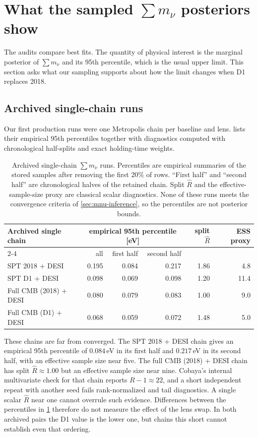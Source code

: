\documentclass[11pt]{article}
\theoremstyle{remark}
\newcommand{\mnu}{\sum m_\nu}
\numberwithin{equation}{section}
\begin{document}
 \section{What the sampled \texorpdfstring{$\mnu$}{neutrino-mass} posteriors show}
\label{sec:results-mnu}

The audits compare best fits. The quantity of physical interest is the marginal posterior of $\mnu$ and its 95th percentile, which is the usual upper limit. This section asks what our sampling supports about how the limit changes when D1 replaces 2018.

\subsection{Archived single-chain runs}
Our first production runs were one Metropolis chain per baseline and lens.  lists their empirical 95th percentiles together with diagnostics computed with chronological half-splits and exact holding-time weights.

\begin{table}[t]
  \centering
  \caption{Archived single-chain $\mnu$ runs. Percentiles are empirical summaries of the stored samples after removing the first 20\% of rows. ``First half'' and ``second half'' are chronological halves of the retained chain. Split $\hat R$ and the effective-sample-size proxy are classical scalar diagnostics. None of these runs meets the convergence criteria of \cref{sec:mnu-inference}, so the percentiles are not posterior bounds.}
  \label{tab:archived-chains}
  \small
  \begin{tabular}{@{}l r r r r r@{}}
\toprule
Archived single chain & \multicolumn{3}{c}{empirical 95th percentile [eV]} & split $\hat R$ & ESS proxy \\
\cmidrule(lr){2-4}
 & all & first half & second half & & \\
\midrule
SPT 2018 + DESI & 0.195 & 0.084 & 0.217 & 1.86 & 4.8 \\
SPT D1 + DESI & 0.098 & 0.069 & 0.098 & 1.20 & 11.4 \\
Full CMB (2018) + DESI & 0.080 & 0.079 & 0.083 & 1.00 & 9.0 \\
Full CMB (D1) + DESI & 0.068 & 0.059 & 0.072 & 1.48 & 5.0 \\
\bottomrule
\end{tabular}
 \end{table}

These chains are far from converged. The SPT 2018 + DESI chain gives an empirical 95th percentile of $0.084$\,eV in its first half and $0.217$\,eV in its second half, with an effective sample size near five. The full CMB (2018) + DESI chain has split $\hat R\approx1.00$ but an effective sample size near nine. Cobaya's internal multivariate check for that chain reports $R-1\approx22$, and a short independent repeat with another seed fails rank-normalized and tail diagnostics. A single scalar $\hat R$ near one cannot overrule such evidence. Differences between the percentiles in \cref{tab:archived-chains} therefore do not measure the effect of the lens swap. In both archived pairs the D1 value is the lower one, but chains this short cannot establish even that ordering.
\end{document}
